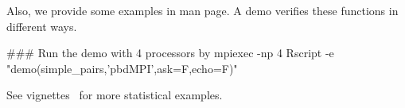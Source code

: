 Also, we provide some examples in man page. A demo verifies these
functions in different ways.
\begin{Command}
### Run the demo with 4 processors by
mpiexec -np 4 Rscript -e "demo(simple_pairs,'pbdMPI',ask=F,echo=F)"
\end{Command}
See  vignettes~\citep{Schmidt2013pbdDEMOvignette}
for more statistical examples.


